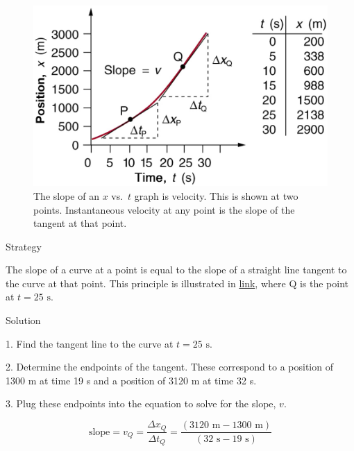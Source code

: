 \documentclass[
]{book}
\newenvironment{tinysection}{}{}
\begin{document}
\begin{figure}
\hypertarget{import-auto-id4141386}{%
\centering
\includegraphics{images/Figure_02_07_03b.jpg}
\caption{The slope of an \(x{}\) vs.~\(t{}\) graph is velocity. This is shown at
two points. Instantaneous velocity at any point is the slope of the
tangent at that
point.}\label{import-auto-id4141386}
}
\end{figure}

\begin{tinysection}

{Strategy}

\end{tinysection}

The slope of a curve at a point is equal to the slope of a straight line
tangent to the curve at that point. This principle is illustrated in
\protect\hyperlink{import-auto-id4141386}{link}, where Q is the
point at \({t = \text{25\ s}}{}\).

\begin{tinysection}

{Solution}

\end{tinysection}

1. Find the tangent line to the curve at \({t = \text{25\ s}}{}\).

2. Determine the endpoints of the tangent. These correspond to a
position of 1300 m at time 19 s and a position of 3120 m at time 32 s.

3. Plug these endpoints into the equation to solve for the slope,
\emph{\(v{}\)}.

\leavevmode\hypertarget{import-auto-id3627758}{}%
\[{{\text{slope} = v_{Q}} = \frac{{\Delta x}_{Q}}{{\Delta t}_{Q}}} = \frac{\left( {\text{3120\ m} - \text{1300\ m}} \right)}{\left( {\text{32\ s} - \text{19\ s}} \right)}\]
\end{document}
